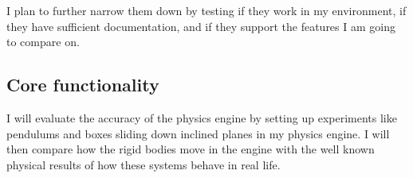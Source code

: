 \documentclass[12pt,a4paper,twoside]{article}
\begin{document}
\begin{table}[h]
    \centering
\end{table}

I plan to further narrow them down by testing if they work in my environment, 
if they have sufficient documentation, 
and if they support the features I am going to compare on.

\subsection*{Core functionality}

I will evaluate the accuracy of the physics engine by setting up experiments like 
pendulums and boxes sliding down inclined planes in my physics engine. 
I will then compare how the rigid bodies move in the engine with the well known 
physical results of how these systems behave in real life.
\end{document}
